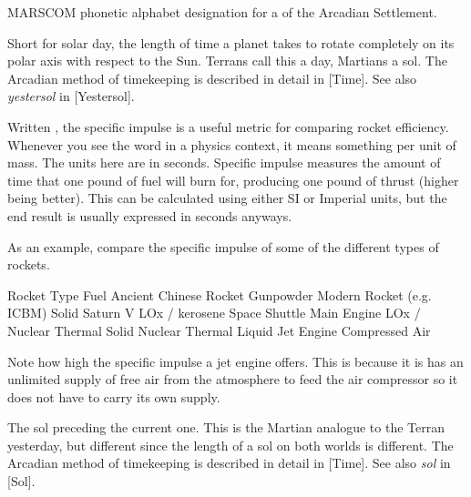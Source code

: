 MARSCOM phonetic alphabet designation for a  of the Arcadian Settlement.

Short for solar day, the length of time a planet takes to rotate completely on its polar axis with respect to the Sun. Terrans call this a day, Martians a sol. The Arcadian method of timekeeping is described in detail in [Time]. See also {\it yestersol} in [Yestersol]. 

Written , the specific impulse is a useful metric for comparing rocket efficiency. Whenever you see the word  in a physics context, it means something per unit of mass. The units here are in seconds. Specific impulse measures the amount of time that one pound of fuel will burn for, producing one pound of thrust (higher being better). This can be calculated using either SI or Imperial units, but the end result is usually expressed in seconds anyways.

As an example, compare the specific impulse of some of the different types of rockets.
\crlf

{
    \bTABLE[split=repeat,option=stretch]%
    \setupTABLE[row][each][align=center]

    \bTABLEhead
    \bTR
      \bTH Rocket Type \eTH
      \bTH Fuel \eTH
      \bTH {} \eTH
    \eTR
    \eTABLEhead
    \bTABLEbody
    \bTR
      \bTC Ancient Chinese Rocket \eTC
      \bTC Gunpowder \eTC
       \eTC
    \eTR
    \bTR
      \bTC Modern Rocket (e.g. ICBM) \eTC
      \bTC Solid \eTC
       \eTC
    \eTR
    \bTR
      \bTC Saturn V \eTC
      \bTC LOx / kerosene \eTC
       \eTC
    \eTR
    \bTR
      \bTC Space Shuttle Main Engine \eTC
      \bTC LOx /  \eTC
       \eTC
    \eTR
    \bTR
      \bTC Nuclear Thermal \eTC
      \bTC Solid \eTC
       \eTC
    \eTR
    \bTR
      \bTC Nuclear Thermal \eTC
      \bTC Liquid \eTC
       \eTC
    \eTR
    \bTR
      \bTC Jet Engine \eTC
      \bTC Compressed Air \eTC
       \eTC
    \eTR
\eTABLEbody
\eTABLE
}

Note how high the specific impulse a jet engine offers. This is because it is has an unlimited supply of free air from the atmosphere to feed the air compressor so it does not have to carry its own supply.

The sol preceding the current one. This is the Martian analogue to the Terran yesterday, but different since the length of a sol on both worlds is different. The Arcadian method of timekeeping is described in detail in [Time]. See also {\it sol} in [Sol].

\StopChapter

